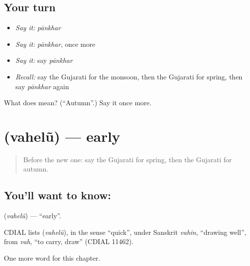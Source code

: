 \subsection*{Your turn}
\begin{itemize}
\raggedright
  \item \emph{Say it:} \emph{pānkhar}
  \item \emph{Say it:} \emph{pānkhar}, once more
  \item \emph{Say it:} say \emph{pānkhar}
  \item \emph{Recall:} say the Gujarati for the monsoon, then the Gujarati for spring, then say \emph{pānkhar} again
\end{itemize}

\begin{tcolorbox}[breakable,colback=teal!4,colframe=teal!35!black,title={Before you move on}]
What does  mean? (\textquotedblleft{}Autumn\textquotedblright{}.) Say it once more.
\end{tcolorbox}
\section[\texorpdfstring{\gu{વહેલું} (vahelũ)}{વહેલું (vahelũ)}]{ (vahelũ) — early}

\label{lesson:GU-C94-vahelu}



\begin{quote}
Before the new one: say the Gujarati for spring, then the Gujarati for autumn.
\end{quote}

\subsection*{You'll want to know: }
\textbf{} (\emph{vahelũ}) — \textquotedblleft{}early\textquotedblright{}.

\begin{cousinweb}
CDIAL lists \textbf{} (\emph{vahelũ}), in the sense \textquotedblleft{}quick\textquotedblright{}, under Sanskrit \emph{vahin}, \textquotedblleft{}drawing well\textquotedblright{}, from \emph{vah}, \textquotedblleft{}to carry, draw\textquotedblright{} (CDIAL 11462).
\end{cousinweb}

\begin{grammarlens}[title={What you've built}]
One more word for this chapter.
\end{grammarlens}

